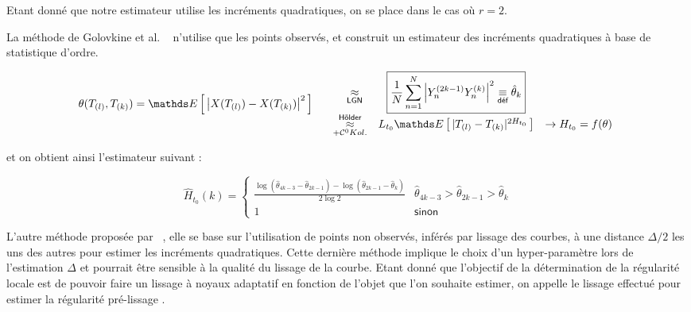 Etant donné que notre estimateur utilise les incréments quadratiques, on se place dans le cas où $r = 2$.



La méthode de Golovkine et al. ~\cite[pages : 7—9]{golovkineRegularityOnlineEstimationNoisyCurve} n'utilise que les points observés, et construit un estimateur des incréments quadratiques à base de statistique d'ordre.

\begin{equation*}
	\theta( T_{(l)}, T_{(k)}) = \esperance{ \left| X( T_{(l)}) - X(T_{(k)}) \right|^2 }  \begin{array}{cccl}
		 & \quad \underset {\textsf{LGN}} \approx
		 & \boxed{\frac 1 {N} \sum\limits_{n=1}^N \left| \statrang Y n {2k-1} \statrang Y n k \right|^2 \isdef \hat \theta_k}
		\\
		 & \, \underset {+ \mathcal C^0 Kol.} {\overset {\textsf{Hölder}} \approx}
		 & L_{t_0} \esperance{| \ordered T l - \ordered T k |^{2H_{t_0}}}
		 & \rightarrow H_{t_0} = f(\theta)
	\end{array}
\end{equation*}

et on obtient ainsi l'estimateur suivant :

\begin{equation*}
	\hat H_{t_0}(k) =
	\begin{cases} \displaystyle\frac{\log\left( \hat \theta_{4k-3} - \hat \theta_{2k-1}  \right) - \log \left(  \hat\theta_{2k-1} - \hat \theta_k \right)}{2\log 2}
		 & \hat \theta_{4k-3} > \hat \theta_{2k-1} > \hat \theta_{k}
		\\
		1
		 & \textsf{sinon}
	\end{cases}
\end{equation*}


L'autre méthode proposée par ~\cite{golovkine2021adaptive,maissoro-SmoothnessFTSweakDep}, elle se base sur l'utilisation de points non observés, inférés par lissage des courbes, à une distance $\Delta / 2$ les uns des autres pour estimer les incréments quadratiques. Cette dernière méthode implique le choix d'un hyper-paramètre lors de l'estimation $\Delta$ et pourrait être sensible à la qualité du lissage de la courbe. Etant donné que l'objectif de la détermination de la régularité locale est de pouvoir faire un lissage à noyaux adaptatif en fonction de l'objet que l'on souhaite estimer, on appelle le lissage effectué pour estimer la régularité \og pré-lissage \fg.

